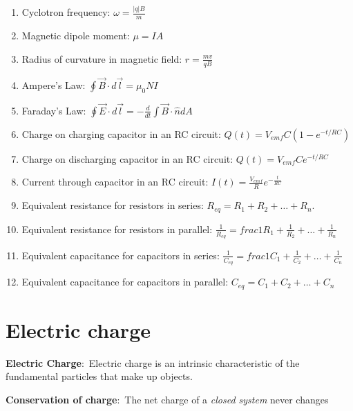 \documentclass[nobib]{tufte-handout}
\newcommand{\defn}[2]{\noindent\textbf{#1}:\ #2}
\begin{document}
\begin{enumerate}
    \item Cyclotron frequency: $\omega = \frac{|q|B}{m}$
    \item Magnetic dipole moment: $\mu = IA$
    \item Radius of curvature in magnetic field: $r = \frac{mv}{qB}$
    \item Ampere's Law: $\oint \vec{B} \cdot d\vec{l} = \mu_0 NI$
    \item Faraday's Law: $\oint \vec{E} \cdot d\vec{l} = -\frac{d}{dt} \int \vec{B} \cdot \hat{n} dA$
    \item Charge on charging capacitor in an RC circuit: $Q(t) = V_{emf} C (1-e^{-t/RC})$
    \item Charge on discharging capacitor in an RC circuit: $Q(t) = V_{emf} C e^{-t/RC}$
    \item Current through capacitor in an RC circuit: $I(t) = \frac{V_{emf}}{R}e^{-\frac{t}{RC}}$
    \item Equivalent resistance for resistors in series: $R_{eq} = R_1 + R_2 + \dots + R_n$. 
    \item Equivalent resistance for resistors in parallel: $\frac{1}{R_{eq}} =frac{1}{R_1} + \frac{1}{R_2} + \dots + \frac{1}{R_n}$
    \item Equivalent capacitance for capacitors in series: $\frac{1}{C_{eq}} =frac{1}{C_1} + \frac{1}{C_2} + \dots + \frac{1}{C_n}$
    \item Equivalent capacitance for capacitors in parallel: $C_{eq} = C_1 + C_2 + \dots + C_n$
\end{enumerate}

\pagebreak 

\section{Electric charge}

\defn{Electric Charge}{Electric charge is an intrinsic characteristic of the
fundamental particles that make up objects.}


\defn{Conservation of charge}{The net charge of a \emph{closed system} never changes}
\end{document}
